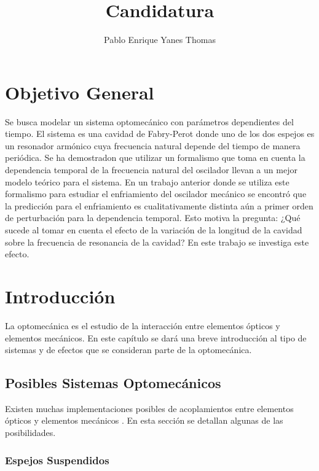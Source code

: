 \documentclass[10pt,a4paper]{report}
\author{Pablo Enrique Yanes Thomas}
\title{Candidatura}
\begin{document}
\tableofcontents
\chapter*{Objetivo General}

Se busca modelar un sistema optomecánico con parámetros dependientes del tiempo. El sistema es una cavidad de Fabry-Perot donde uno de los dos espejos es un resonador armónico cuya frecuencia natural depende del tiempo de manera periódica. Se ha demostradon que utilizar un formalismo que toma en cuenta la dependencia temporal de la frecuencia natural del oscilador llevan a un mejor modelo teórico para el sistema\cite{HanngiFM}. En un trabajo anterior donde se utiliza este formalismo para estudiar el enfriamiento del oscilador mecánico se encontró que la predicción para el enfriamiento es cualitativamente distinta aún a primer orden de perturbación para la dependencia temporal\cite{YanesOC}. Esto motiva la pregunta: ¿Qué sucede al tomar en cuenta el efecto de la variación de la longitud de la cavidad sobre la frecuencia de resonancia de la cavidad? En este trabajo se investiga este efecto. 


\chapter{Introducción}

La optomecánica es el estudio de la interacción entre elementos ópticos y elementos mecánicos. En este capítulo se dará una breve introducción al tipo de sistemas y de efectos que se consideran parte de la optomecánica. 


\section{Posibles Sistemas Optomecánicos}

Existen muchas implementaciones posibles de acoplamientos entre elementos ópticos y elementos mecánicos \cite{KippenberCO}. En esta sección se detallan algunas de las posibilidades.

\subsection{Espejos Suspendidos}
\end{document}
